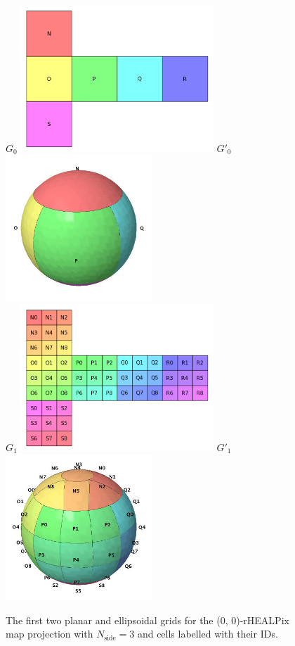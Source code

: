 \documentclass[12pt]{iopart}
\newcommand{\nside}{N_{\text{side}}}
\begin{document}
\begin{figure}[!htb]
\centering
$G_0$ \includegraphics[height=55mm]{fig-grids_grid0_00.png} \qquad
$G'_0$ \includegraphics[height=55mm]{fig-grids_grid0_00_ellipsoid.png} \\
$G_1$ \includegraphics[height=55mm]{fig-grids_grid1_00.png} \qquad
$G'_1$ \includegraphics[height=55mm]{fig-grids_grid1_00_ellipsoid.png} \\
\caption{The first two planar and ellipsoidal grids for the (0, 0)-rHEALPix map projection with $\nside = 3$ and cells labelled with their IDs.}
\label{fig:grids}
\end{figure}
\end{document}
